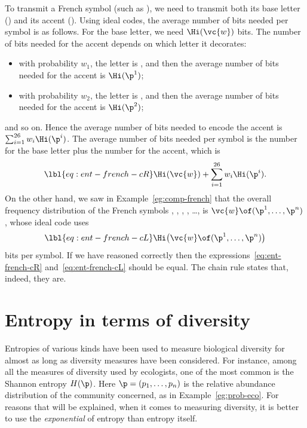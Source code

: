 \begin{example}
To transmit a French symbol (such as ), we need to transmit both its
base letter () and its accent (\as{\`{\:}}).  Using ideal
codes, the average number of bits needed per symbol is as follows.  For
the base letter, we need $\Hi(\vc{w})$ bits.  The number of bits needed for
the accent depends on which letter it decorates:
% 
\begin{itemize}
\item 
with probability $w_1$, the letter is , and then the average number
of bits needed for the accent is $\Hi(\p^1)$;

\item 
with probability $w_2$, the letter is , and then the average number
of bits needed for the accent is $\Hi(\p^2)$;
\end{itemize}
% 
and so on.  Hence the average number of bits needed to encode the accent is
$\sum_{i = 1}^{26} w_i \Hi(\p^i)$.  The average number of bits needed per
symbol is the number for the base letter plus the number for the accent,
which is
% 
\begin{equation}
\lbl{eq:ent-french-cR}
\Hi(\vc{w}) + \sum_{i = 1}^{26} w_i \Hi(\p^i).
\end{equation}
% 
On the other hand, we saw in Example~\ref{eg:comp-french} that the overall
frequency distribution of the French symbols , , ,
, \ldots,  is $\vc{w} \of (\p^1, \ldots, \p^n)$, whose ideal
code uses
% 
\begin{equation}
\lbl{eq:ent-french-cL}
\Hi\bigl(\vc{w} \of (\p^1, \ldots, \p^n)\bigr)
\end{equation}
% 
bits per symbol.  If we have reasoned correctly then the
expressions~\eqref{eq:ent-french-cR} and~\eqref{eq:ent-french-cL} should be
equal.  The chain rule states that, indeed, they are.
\end{example}


\section{Entropy in terms of diversity}

Entropies of various kinds have been used to measure biological diversity
for almost as long as diversity measures have been considered.  For
instance, among all the measures of diversity used by ecologists, one of the
most common is the Shannon entropy $H(\p)$.  Here $\p = (p_1, \ldots, p_n)$
is the relative abundance distribution of the community concerned, as in
Example~\ref{eg:prob-eco}.  For reasons that will be explained, when it
comes to measuring diversity, it is better to use the \emph{exponential} of
entropy than entropy itself.

